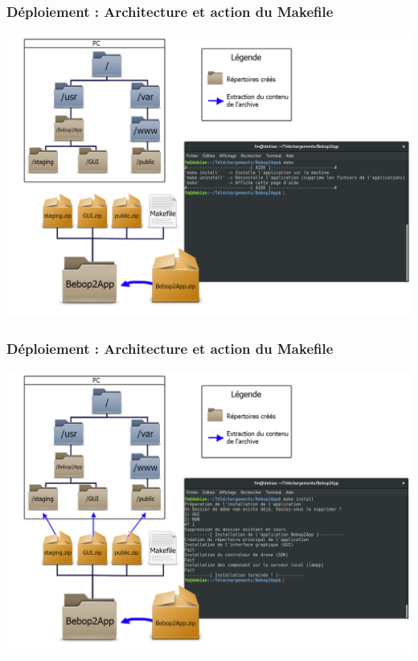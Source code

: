 \documentclass{beamer}
\begin{document}
	\begin{frame}
		\begin{center}
		\frametitle{Déploiement : Architecture et action du Makefile}
        \includegraphics[scale=0.24]{schema_deploiement_02.png}
		\end{center}
	\end{frame}
	
	
	\begin{frame}
		\begin{center}
		\frametitle{Déploiement : Architecture et action du Makefile}
        \includegraphics[scale=0.24]{schema_deploiement_03.png}
		\end{center}
	\end{frame}
\end{document}
